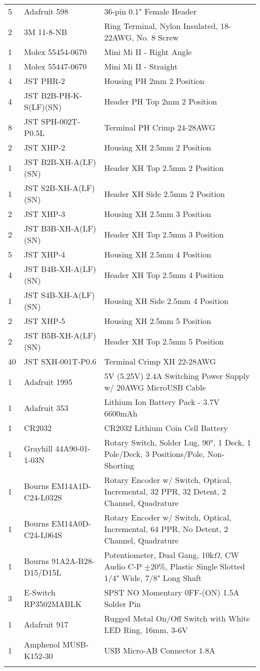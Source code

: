\begin{longtabu}{X[1,c,m] X[6,c,m] X[9,l,m]}
  5 & Adafruit 598 & 36-pin 0.1" Female Header \\
  2 & 3M 11-8-NB & Ring Terminal, Nylon Insulated, 18-22AWG, No. 8 Screw \\
  1 & Molex 55454-0670 & Mini Mi II - Right Angle \\
  1 & Molex 55447-0670 & Mini Mi II - Straight \\
  4 & JST PHR-2 & Housing PH 2mm 2 Position \\
  4 & JST B2B-PH-K-S(LF)(SN) & Header PH Top 2mm 2 Position \\
  8 & JST SPH-002T-P0.5L & Terminal PH Crimp 24-28AWG \\
  2 & JST XHP-2 & Housing XH 2.5mm 2 Position \\
  1 & JST B2B-XH-A(LF)(SN) & Header XH Top 2.5mm 2 Position \\
  1 & JST S2B-XH-A(LF)(SN) & Header XH Side 2.5mm 2 Position \\
  2 & JST XHP-3 & Housing XH 2.5mm 3 Position \\
  2 & JST B3B-XH-A(LF)(SN) & Header XH Top 2.5mm 3 Position \\
  5 & JST XHP-4 & Housing XH 2.5mm 4 Position \\
  4 & JST B4B-XH-A(LF)(SN) & Header XH Top 2.5mm 4 Position \\
  1 & JST S4B-XH-A(LF)(SN) & Housing XH Side 2.5mm 4 Position \\
  2 & JST XHP-5 & Housing XH 2.5mm 5 Position \\
  2 & JST B5B-XH-A(LF)(SN) & Header XH Top 2.5mm 5 Position \\
  40 & JST SXH-001T-P0.6 & Terminal Crimp XH 22-28AWG \\ \mrule

  1 & Adafruit 1995 & 5V (5.25V) 2.4A Switching Power Supply w/ 20AWG MicroUSB Cable \\
  1 & Adafruit 353 & Lithium Ion Battery Pack - 3.7V 6600mAh \\
  1 & CR2032 & CR2032 Lithium Coin Cell Battery \\ \mrule

  1 & Grayhill 44A90-01-1-03N & Rotary Switch, Solder Lug, 90°, 1 Deck, 1 Pole/Deck, 3 Positions/Pole, Non-Shorting \\
  1 & Bourns EM14A1D-C24-L032S & Rotary Encoder w/ Switch, Optical, Incremental, 32 PPR, 32 Detent, 2 Channel, Quadrature \\
  1 & Bourns EM14A0D-C24-L064S & Rotary Encoder w/ Switch, Optical, Incremental, 64 PPR, No Detent, 2 Channel, Quadrature \\
  1 & Bourns 91A2A-B28-D15/D15L & Potentiometer, Dual Gang, 10k$\Omega$, CW Audio C-P $\pm$20\%, Plastic Single Slotted 1/4" Wide, 7/8" Long Shaft \\
  3 & E-Switch RP3502MABLK & SPST NO Momentary 0FF-(ON) 1.5A Solder Pin \\
  1 & Adafruit 917 & Rugged Metal On/Off Switch with White LED Ring, 16mm, 3-6V \\
  1 & Amphenol MUSB-K152-30 & USB Micro-AB Connector 1.8A \\ \mrule


\end{longtabu}
